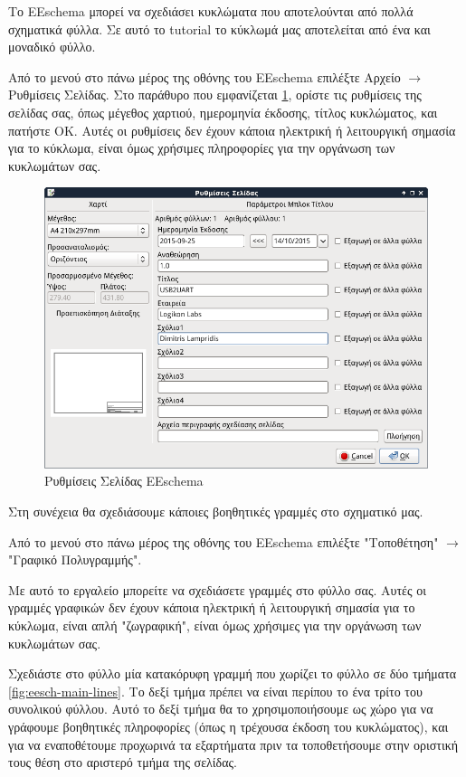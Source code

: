 \documentclass[a4paper]{article}
\begin{document}
Το \textenglish{EEschema} μπορεί να σχεδιάσει κυκλώματα που αποτελούνται από πολλά σχηματικά φύλλα. Σε αυτό το tutorial το κύκλωμά μας αποτελείται από ένα και μοναδικό φύλλο.

Από το μενού στο πάνω μέρος της οθόνης του \textenglish{EEschema} επιλέξτε Αρχείο $\rightarrow$ Ρυθμίσεις Σελίδας. Στο παράθυρο που εμφανίζεται \ref{fig:eesch-dial-pagesett}, ορίστε τις ρυθμίσεις της σελίδας σας, όπως μέγεθος χαρτιού, ημερομηνία έκδοσης, τίτλος κυκλώματος, και πατήστε ΟΚ. Αυτές οι ρυθμίσεις δεν έχουν κάποια ηλεκτρική ή λειτουργική σημασία για το κύκλωμα, είναι όμως χρήσιμες πληροφορίες για την οργάνωση των κυκλωμάτων σας.

\begin{figure}
  \begin{center}
    \includegraphics[width=.9\textwidth]{img/eesch-dial-pagesett.png}
    \caption{Ρυθμίσεις Σελίδας \textenglish{EEschema}}
    \label{fig:eesch-dial-pagesett}
  \end{center}
\end{figure}

Στη συνέχεια θα σχεδιάσουμε κάποιες βοηθητικές γραμμές στο σχηματικό μας.

Από το μενού στο πάνω μέρος της οθόνης του \textenglish{EEschema} επιλέξτε "Τοποθέτηση" $\rightarrow$ "Γραφικό Πολυγραμμής".

Με αυτό το εργαλείο μπορείτε να σχεδιάσετε γραμμές στο φύλλο σας. Αυτές οι γραμμές γραφικών δεν έχουν κάποια ηλεκτρική ή λειτουργική σημασία για το κύκλωμα, είναι απλή "ζωγραφική", είναι όμως χρήσιμες για την οργάνωση των κυκλωμάτων σας.

Σχεδιάστε στο φύλλο μία κατακόρυφη γραμμή που χωρίζει το φύλλο σε δύο τμήματα \ref{fig:eesch-main-lines}. Το δεξί τμήμα πρέπει να είναι περίπου το ένα τρίτο του συνολικού φύλλου. Αυτό το δεξί τμήμα θα το χρησιμοποιήσουμε ως χώρο για να γράφουμε  βοηθητικές πληροφορίες (όπως η τρέχουσα έκδοση του κυκλώματος), και για να εναποθέτουμε προχωρινά τα εξαρτήματα πριν τα τοποθετήσουμε στην οριστική τους θέση στο αριστερό τμήμα της σελίδας.
\end{document}
